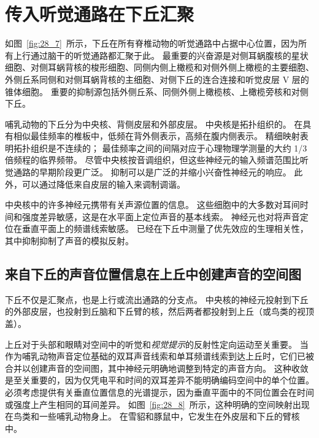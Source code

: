 \section{传入听觉通路在下丘汇聚}

如图~\ref{fig:28_7}~所示，下丘在所有脊椎动物的听觉通路中占据中心位置，因为所有上行通过脑干的听觉通路都汇聚于此。
最重要的兴奋源是对侧耳蜗腹核的星状细胞、对侧耳蜗背核的梭形细胞、同侧内侧上橄榄和对侧外侧上橄榄的主要细胞、外侧丘系同侧和对侧耳蜗背核的主细胞、对侧下丘的连合连接和听觉皮层 V 层的锥体细胞。
重要的抑制源包括外侧丘系、同侧外侧上橄榄核、上橄榄旁核和对侧下丘。


哺乳动物的下丘分为中央核、背侧皮层和外部皮层。
中央核是拓扑组织的。 
在具有相似最佳频率的椎板中，低频在背外侧表示，高频在腹内侧表示。
精细映射表明拓扑组织是不连续的； 
最佳频率之间的间隔对应于心理物理学测量的大约 1/3 倍频程的临界频带。
尽管中央核按音调组织，但这些神经元的输入频谱范围比听觉通路的早期阶段更广泛。
抑制可以是广泛的并缩小兴奋性神经元的响应。
此外，可以通过降低来自皮层的输入来调制调谐。


中央核中的许多神经元携带有关声源位置的信息。
这些细胞中的大多数对耳间时间和强度差异敏感，这是在水平面上定位声音的基本线索。
神经元也对将声音定位在垂直平面上的频谱线索敏感。
已经在下丘中测量了优先效应的生理相关性，其中抑制抑制了声音的模拟反射。




\subsection{来自下丘的声音位置信息在上丘中创建声音的空间图}

下丘不仅是汇聚点，也是上行或流出通路的分支点。
中央核的神经元投射到下丘的外部皮层，也投射到丘脑和下丘臂的核，然后两者都投射到上丘（或鸟类的视顶盖）。


上丘对于头部和眼睛对空间中的听觉和\textit{视觉提示}的反射性定向运动至关重要。
当作为哺乳动物声音定位基础的双耳声音线索和单耳频谱线索到达上丘时，它们已被合并以创建声音的空间图，其中神经元明确地调整到特定的声音方向。
这种收敛是至关重要的，因为仅凭电平和时间的双耳差异不能明确编码空间中的单个位置。
必须考虑提供有关垂直位置信息的光谱提示，因为垂直平面中的不同位置会在时间或强度上产生相同的耳间差异。
如图~\ref{fig:28_8}~所示，这种明确的空间映射出现在鸟类和一些哺乳动物身上。
在雪貂和豚鼠中，它发生在外皮层和下丘的臂核中。


